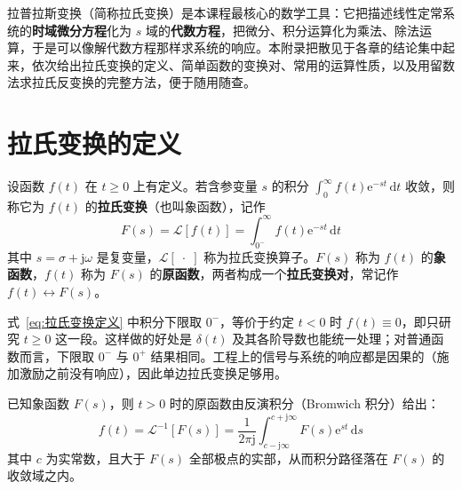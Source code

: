 
拉普拉斯变换（简称拉氏变换）是本课程最核心的数学工具：它把描述线性定常系统的\textbf{时域微分方程}化为 $s$ 域的\textbf{代数方程}，把微分、积分运算化为乘法、除法运算，于是可以像解代数方程那样求系统的响应。本附录把散见于各章的结论集中起来，依次给出拉氏变换的定义、简单函数的变换对、常用的运算性质，以及用留数法求拉氏反变换的完整方法，便于随用随查。

\section{拉氏变换的定义}
\label{sec:拉氏变换的定义}

\begin{definition}[单边拉氏变换]
设函数 $f(t)$ 在 $t\ge 0$ 上有定义。若含参变量 $s$ 的积分 $\int_{0}^{\infty}f(t)\mathrm{e}^{-st}\,\mathrm{d}t$ 收敛，则称它为 $f(t)$ 的\textbf{拉氏变换}（也叫象函数），记作
\begin{equation}
F(s)=\mathcal{L}\left[f(t)\right]=\int_{0^{-}}^{\infty}f(t)\mathrm{e}^{-st}\,\mathrm{d}t
\label{eq:拉氏变换定义}
\end{equation}
其中 $s=\sigma+\mathrm{j}\omega$ 是复变量，$\mathcal{L}[\;\cdot\;]$ 称为拉氏变换算子。$F(s)$ 称为 $f(t)$ 的\textbf{象函数}，$f(t)$ 称为 $F(s)$ 的\textbf{原函数}，两者构成一个\textbf{拉氏变换对}，常记作 $f(t)\leftrightarrow F(s)$。
\end{definition}

\begin{remark}
式~\eqref{eq:拉氏变换定义} 中积分下限取 $0^{-}$，等价于约定 $t<0$ 时 $f(t)\equiv 0$，即只研究 $t\ge 0$ 这一段。这样做的好处是 $\delta(t)$ 及其各阶导数也能统一处理；对普通函数而言，下限取 $0^{-}$ 与 $0^{+}$ 结果相同。工程上的信号与系统的响应都是因果的（施加激励之前没有响应），因此单边拉氏变换足够用。
\end{remark}

\begin{definition}[拉氏反变换]
已知象函数 $F(s)$，则 $t>0$ 时的原函数由反演积分（Bromwich 积分）给出：
\begin{equation}
f(t)=\mathcal{L}^{-1}\left[F(s)\right]=\frac{1}{2\pi\mathrm{j}}\int_{c-\mathrm{j}\infty}^{c+\mathrm{j}\infty}F(s)\mathrm{e}^{st}\,\mathrm{d}s
\label{eq:拉氏反变换定义}
\end{equation}
其中 $c$ 为实常数，且大于 $F(s)$ 全部极点的实部，从而积分路径落在 $F(s)$ 的收敛域之内。
\end{definition}

